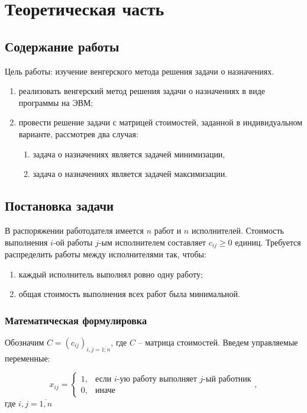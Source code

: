 \chapter{Теоретическая часть}


\section{Содержание работы}

Цель работы: изучение венгерского метода решения задачи о назначениях.

\begin{enumerate}
\item реализовать венгерский метод решения задачи о назначениях в виде программы на ЭВМ;
\item провести решение задачи с матрицей стоимостей, заданной в индивидуальном варианте, рассмотрев два случая:
\begin{enumerate}
\item задача о назначениях является задачей минимизации,
\item задача о назначениях является задачей максимизации.
\end{enumerate}
\end{enumerate}

\section{Постановка задачи}

В распоряжении работодателя имеется $n$ работ и $n$ исполнителей. Стоимость выполнения $i$-ой работы $j$-ым исполнителем составляет $c_{ij} \geq 0$ единиц. Требуется распределить работы между исполнителями так, чтобы:
\begin{enumerate}
\item каждый исполнитель выполнял ровно одну работу;
\item общая стоимость выполнения всех работ была минимальной.
\end{enumerate}

\subsection{Математическая формулировка}

Обозначим $C=(c_{ij})_{i,j = \overline{1;n}}$, где $C$ -- матрица стоимостей.
Введем управляемые переменные:

\begin{equation}
x_{ij} =
 \begin{cases}
   1, &\text{если $i$-ую работу выполняет $j$-ый работник}
   \\
   0, &\text{иначе}
 \end{cases},  
\end{equation}
где $i,j = \overline{1,n}$\\

